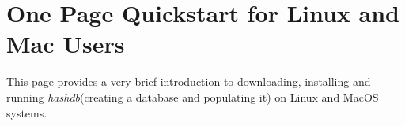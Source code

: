 \documentclass[11pt,fleqn]{article} %
\begin{document}
\newcommand \hash {\textit{hashdb}\xspace}
\newcommand \bulk {\textbf{bulk\_extractor}\xspace}





\setlength{\parindent}{0pt} %
\newpage
\thispagestyle{empty}
\mbox{}
\newpage
\section*{One Page Quickstart for Linux and Mac Users}
This page provides a very brief introduction to downloading, installing and running \hash (creating a database and populating it) on Linux and MacOS systems. 
\end{document}
